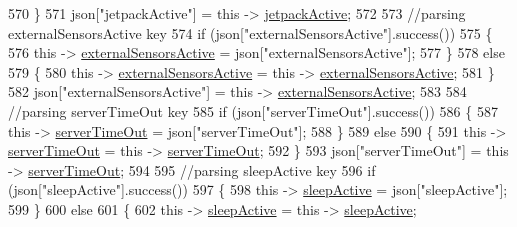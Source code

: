 \begin{DoxyCode}
570             \}
571             json[\textcolor{stringliteral}{"jetpackActive"}] = \textcolor{keyword}{this} -> \hyperlink{classCoolBoard_a9be03a913d26e558328935ca3b59a75e}{jetpackActive};
572 
573             \textcolor{comment}{//parsing externalSensorsActive key}
574             \textcolor{keywordflow}{if} (json[\textcolor{stringliteral}{"externalSensorsActive"}].success())
575             \{
576                 \textcolor{keyword}{this} -> \hyperlink{classCoolBoard_a638b00b76aeb819ecfd4c10b8cdd7bb7}{externalSensorsActive} = json[\textcolor{stringliteral}{"externalSensorsActive"}];
577             \}
578             \textcolor{keywordflow}{else}
579             \{
580                 \textcolor{keyword}{this} -> \hyperlink{classCoolBoard_a638b00b76aeb819ecfd4c10b8cdd7bb7}{externalSensorsActive} = \textcolor{keyword}{this} -> 
      \hyperlink{classCoolBoard_a638b00b76aeb819ecfd4c10b8cdd7bb7}{externalSensorsActive};
581             \}
582             json[\textcolor{stringliteral}{"externalSensorsActive"}] = \textcolor{keyword}{this} -> \hyperlink{classCoolBoard_a638b00b76aeb819ecfd4c10b8cdd7bb7}{externalSensorsActive};
583 
584             \textcolor{comment}{//parsing serverTimeOut key}
585             \textcolor{keywordflow}{if} (json[\textcolor{stringliteral}{"serverTimeOut"}].success())
586             \{
587                 \textcolor{keyword}{this} -> \hyperlink{classCoolBoard_a7a8d8d3d316220cdd049cd63c1aa8fe6}{serverTimeOut} = json[\textcolor{stringliteral}{"serverTimeOut"}];
588             \}
589             \textcolor{keywordflow}{else}
590             \{
591                 \textcolor{keyword}{this} -> \hyperlink{classCoolBoard_a7a8d8d3d316220cdd049cd63c1aa8fe6}{serverTimeOut} = \textcolor{keyword}{this} -> \hyperlink{classCoolBoard_a7a8d8d3d316220cdd049cd63c1aa8fe6}{serverTimeOut};
592             \}
593             json[\textcolor{stringliteral}{"serverTimeOut"}] = \textcolor{keyword}{this} -> \hyperlink{classCoolBoard_a7a8d8d3d316220cdd049cd63c1aa8fe6}{serverTimeOut};
594             
595             \textcolor{comment}{//parsing sleepActive key}
596             \textcolor{keywordflow}{if} (json[\textcolor{stringliteral}{"sleepActive"}].success())
597             \{
598                 \textcolor{keyword}{this} -> \hyperlink{classCoolBoard_a0a51b2287139f66c738101fb53139230}{sleepActive} = json[\textcolor{stringliteral}{"sleepActive"}];
599             \}
600             \textcolor{keywordflow}{else}
601             \{
602                 \textcolor{keyword}{this} -> \hyperlink{classCoolBoard_a0a51b2287139f66c738101fb53139230}{sleepActive} = \textcolor{keyword}{this} -> \hyperlink{classCoolBoard_a0a51b2287139f66c738101fb53139230}{sleepActive};

\end{DoxyCode}
